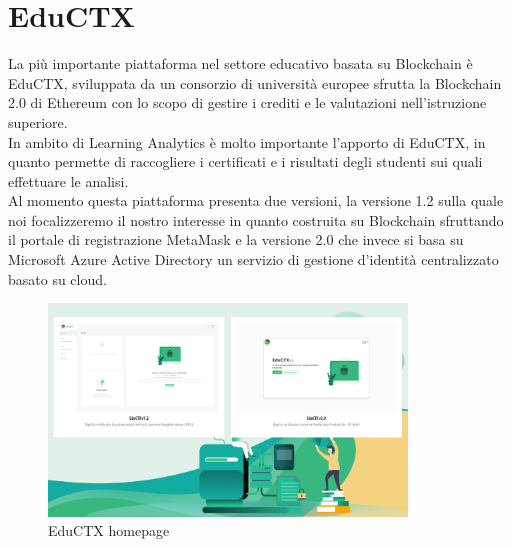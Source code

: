 \newpage
\section{EduCTX}
La più importante piattaforma nel settore educativo basata su Blockchain è EduCTX, sviluppata da un consorzio di università europee sfrutta la Blockchain 2.0 di Ethereum con lo scopo di gestire i crediti e le valutazioni nell'istruzione superiore.
\\In ambito di Learning Analytics è molto importante l'apporto di EduCTX, in quanto permette di raccogliere i certificati e i risultati degli studenti sui quali effettuare le analisi.
\\Al momento questa piattaforma presenta due versioni, la versione 1.2 sulla quale noi focalizzeremo il nostro interesse in quanto costruita su Blockchain
sfruttando il portale di registrazione MetaMask e la versione 2.0 che invece si basa su Microsoft Azure Active Directory un servizio di gestione d'identità centralizzato basato su cloud.
\begin{figure}[h]
    \centering
    \includegraphics[width=0.85\textwidth]{Immagini/EduCTX.PNG}
    \caption{EduCTX homepage}
\end{figure}


